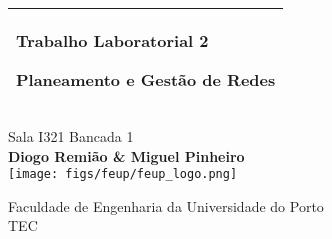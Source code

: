 %
%
%
%
%
\begin{titlepage}
  \addtolength{\hoffset}{0.5\evensidemargin-0.5\oddsidemargin} %
  \noindent%
  \begin{tabular}{@{}p{\textwidth}@{}}
    \toprule[2pt]
    \midrule
    \vspace{0.2cm}
    \begin{center}
    \Huge{\textbf{
        Trabalho Laboratorial 2 %
    }}
    \end{center}
    \begin{center}
      \Large{
        Planeamento e Gestão de Redes %
      }
    \end{center}
    \vspace{0.2cm}\\
    \midrule
    \toprule[2pt]
  \end{tabular}
  \vspace{2cm}
  \begin{center}
    {\large
    Sala I321 Bancada 1  %
    }\\
    \vspace{0.2cm}
    {\Large
      \textbf{Diogo Remião \& Miguel Pinheiro} \\ %
      \vspace{4cm}
      \texttt{[image: figs/feup/feup\_logo.png]}
    }
  \end{center}
  \vfill
  \begin{center}
  \vspace{0.5cm}
  Faculdade de Engenharia da Universidade do Porto\\
  TEC
  \end{center}
\end{titlepage}
\clearpage
